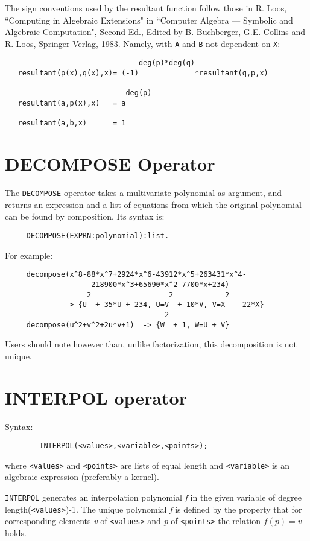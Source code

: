The sign conventions used by the resultant function follow those in R.
Loos, ``Computing in Algebraic Extensions" in ``Computer Algebra --- Symbolic
and Algebraic Computation", Second Ed., Edited by B. Buchberger, G.E.
Collins and R. Loos, Springer-Verlag, 1983. Namely, with {\tt A} and {\tt B}
not dependent on {\tt X}:
\newpage
\begin{verbatim}
                               deg(p)*deg(q)
   resultant(p(x),q(x),x)= (-1)             *resultant(q,p,x)

                            deg(p)
   resultant(a,p(x),x)   = a

   resultant(a,b,x)      = 1
\end{verbatim}

\section{DECOMPOSE Operator}

The {\tt DECOMPOSE} operator takes a multivariate polynomial as argument,
and returns an expression and a list of equations from which the
original polynomial can be found by composition.  Its syntax is:
\begin{verbatim}
     DECOMPOSE(EXPRN:polynomial):list.
\end{verbatim}
For example:
\begin{verbatim}
     decompose(x^8-88*x^7+2924*x^6-43912*x^5+263431*x^4-
                    218900*x^3+65690*x^2-7700*x+234)
                   2                  2            2
              -> {U  + 35*U + 234, U=V  + 10*V, V=X  - 22*X}
                                     2
     decompose(u^2+v^2+2u*v+1)  -> {W  + 1, W=U + V}
\end{verbatim}
Users should note however than, unlike factorization, this decomposition
is not unique.

\section{INTERPOL operator}

Syntax:
\begin{verbatim}
        INTERPOL(<values>,<variable>,<points>);
\end{verbatim}

where {\tt <values>} and {\tt <points>} are lists of equal length and
{\tt <variable>} is an algebraic expression (preferably a kernel).

{\tt INTERPOL} generates an interpolation polynomial {\em f} in the given
variable of degree length({\tt <values>})-1.  The unique polynomial {\em f}
is defined by the property that for corresponding elements {\em v} of
{\tt <values>} and {\em p} of {\tt <points>} the relation $f(p)=v$ holds.

